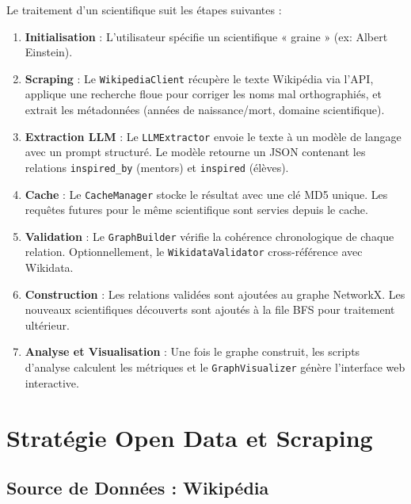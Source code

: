 \documentclass[12pt,a4paper]{report}
\begin{document}
Le traitement d'un scientifique suit les étapes suivantes :

\begin{enumerate}
    \item \textbf{Initialisation} : L'utilisateur spécifie un scientifique « graine » (ex: Albert Einstein).

    \item \textbf{Scraping} : Le \texttt{WikipediaClient} récupère le texte Wikipédia via l'API, applique une recherche floue pour corriger les noms mal orthographiés, et extrait les métadonnées (années de naissance/mort, domaine scientifique).

    \item \textbf{Extraction LLM} : Le \texttt{LLMExtractor} envoie le texte à un modèle de langage avec un prompt structuré. Le modèle retourne un JSON contenant les relations \texttt{inspired\_by} (mentors) et \texttt{inspired} (élèves).

    \item \textbf{Cache} : Le \texttt{CacheManager} stocke le résultat avec une clé MD5 unique. Les requêtes futures pour le même scientifique sont servies depuis le cache.

    \item \textbf{Validation} : Le \texttt{GraphBuilder} vérifie la cohérence chronologique de chaque relation. Optionnellement, le \texttt{WikidataValidator} cross-référence avec Wikidata.

    \item \textbf{Construction} : Les relations validées sont ajoutées au graphe NetworkX. Les nouveaux scientifiques découverts sont ajoutés à la file BFS pour traitement ultérieur.

    \item \textbf{Analyse et Visualisation} : Une fois le graphe construit, les scripts d'analyse calculent les métriques et le \texttt{GraphVisualizer} génère l'interface web interactive.
\end{enumerate}

\chapter{Stratégie Open Data et Scraping}

\section{Source de Données : Wikipédia}
\end{document}
